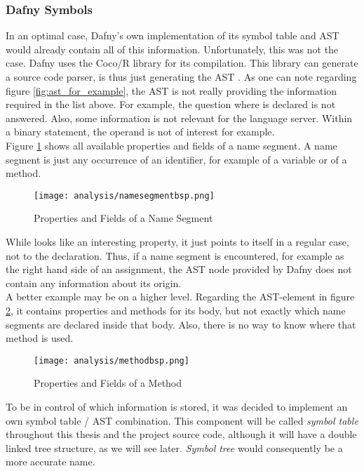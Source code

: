 \subsubsection{Dafny Symbols}
In an optimal case, Dafny's own implementation of its symbol table and AST would already contain all of this information.
Unfortunately, this was not the case.
Dafny uses the Coco/R library for its compilation.
This library can generate a source code parser, is thus just generating the AST \cite{coco}.
As one can note regarding figure \ref{fig:ast_for_example}, the AST is not really providing the information required in the list above.
For example, the question where  is declared is not answered.
Also, some information is not relevant for the language server.
Within a binary statement, the operand is not of interest for example.\\

Figure \ref{fig:namesegment} shows all available properties and fields of a name segment.
A name segment is just any occurrence of an identifier, for example of a variable or of a method.
\begin{figure}[H]
    \centering
    \texttt{[image: analysis/namesegmentbsp.png]}
    \caption{Properties and Fields of a Name Segment}
    \label{fig:namesegment}
\end{figure}
While  looks like an interesting property, it just points to itself in a regular case, not to the declaration.
Thus, if a name segment is encountered, for example as the right hand side of an assignment, the AST node provided by Dafny does not contain any information about its origin.\\

A better example may be on a higher level.
Regarding the AST-element  in figure \ref{fig:method},
it contains properties and methods for its body, but not exactly which name segments are declared inside that body.
Also, there is no way to know where that method is used.

\begin{figure}[H]
    \centering
    \texttt{[image: analysis/methodbsp.png]}
    \caption{Properties and Fields of a Method}
    \label{fig:method}
\end{figure}

To be in control of which information is stored, it was decided to implement an own symbol table / AST combination.
This component will be called \textit{symbol table} throughout this thesis and the project source code, although it will have a double linked tree structure, as we will see later.
\textit{Symbol tree} would consequently be a more accurate name.

